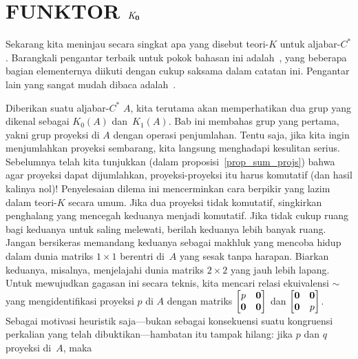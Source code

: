 \chapter{FUNKTOR $\mathbf{\emph{K}_0}$}

Sekarang kita meninjau secara singkat apa yang disebut teori-$K$ untuk aljabar-$C^*$. Barangkali pengantar terbaik untuk pokok bahasan ini adalah~\cite{RordamLL:2000},
yang beberapa bagian elementernya diikuti dengan cukup saksama dalam catatan ini. Pengantar lain yang sangat mudah dibaca adalah~\cite{Wegge-Olsen:1993}.

Diberikan suatu aljabar-$C^*$ $A$, kita terutama akan memperhatikan dua grup yang dikenal sebagai $K_0(A)$ dan~$K_1(A)$. Bab ini membahas
grup yang pertama, yakni grup proyeksi di $A$ dengan operasi penjumlahan. Tentu saja, jika kita ingin menjumlahkan proyeksi sembarang, kita langsung
menghadapi kesulitan serius. Sebelumnya telah kita tunjukkan (dalam proposisi~\ref{prop_sum_projs}) bahwa agar proyeksi dapat dijumlahkan, proyeksi-proyeksi itu harus komutatif
(dan hasil kalinya nol)! Penyelesaian dilema ini mencerminkan cara berpikir yang lazim dalam teori-$K$ secara umum. Jika dua proyeksi tidak
komutatif, singkirkan penghalang yang mencegah keduanya menjadi komutatif. Jika tidak cukup ruang bagi keduanya untuk saling melewati, berilah keduanya lebih banyak
ruang. Jangan bersikeras memandang keduanya sebagai makhluk yang mencoba hidup dalam dunia matriks $1 \times 1$ berentri di~$A$ yang sesak tanpa harapan.
Biarkan keduanya, misalnya, menjelajahi dunia matriks $2 \times 2$ yang jauh lebih lapang. %
Untuk mewujudkan gagasan ini secara teknis, kita mencari relasi ekuivalensi $\sim$ yang mengidentifikasi proyeksi $p$ di $A$ dengan matriks $\begin{bmatrix} p & \mathbf{0} \\ \mathbf{0} & \mathbf{0} \end{bmatrix}$
dan $\begin{bmatrix} \mathbf{0} & \mathbf{0} \\ \mathbf{0} & p \end{bmatrix}$. Sebagai motivasi heuristik saja---bukan sebagai konsekuensi suatu kongruensi perkalian yang telah dibuktikan---hambatan itu tampak hilang: jika $p$ dan $q$ proyeksi di~$A$, maka %
